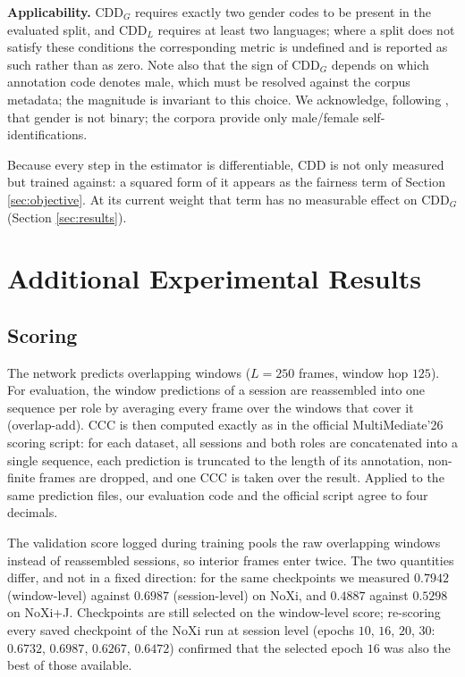 \documentclass[10pt,a4paper,twocolumn]{article}
\begin{document}
	\textbf{Applicability.} $\text{CDD}_G$ requires exactly two gender codes to be present in the evaluated split, and $\text{CDD}_L$ requires at least two languages; where a split does not satisfy these conditions the corresponding metric is undefined and is reported as such rather than as zero. Note also that the sign of $\text{CDD}_G$ depends on which annotation code denotes male, which must be resolved against the corpus metadata; the magnitude is invariant to this choice. We acknowledge, following \cite{withanage25}, that gender is not binary; the corpora provide only male/female self-identifications.

	Because every step in the estimator is differentiable, CDD is not only measured but trained against: a squared form of it appears as the fairness term of Section \ref{sec:objective}. At its current weight that term has no measurable effect on $\text{CDD}_G$ (Section \ref{sec:results}).


	\section{Additional Experimental Results}
	\label{app:experiments}
	\subsection*{Scoring}
	The network predicts overlapping windows ($L = 250$ frames, window hop $125$). For evaluation, the window predictions of a session are reassembled into one sequence per role by averaging every frame over the windows that cover it (overlap-add). CCC is then computed exactly as in the official MultiMediate'26 scoring script: for each dataset, all sessions and both roles are concatenated into a single sequence, each prediction is truncated to the length of its annotation, non-finite frames are dropped, and one CCC is taken over the result. Applied to the same prediction files, our evaluation code and the official script agree to four decimals.

	The validation score logged during training pools the raw overlapping windows instead of reassembled sessions, so interior frames enter twice. The two quantities differ, and not in a fixed direction: for the same checkpoints we measured $0.7942$ (window-level) against $0.6987$ (session-level) on NoXi, and $0.4887$ against $0.5298$ on NoXi+J. Checkpoints are still selected on the window-level score; re-scoring every saved checkpoint of the NoXi run at session level (epochs $10$, $16$, $20$, $30$: $0.6732$, $0.6987$, $0.6267$, $0.6472$) confirmed that the selected epoch $16$ was also the best of those available.
\end{document}
